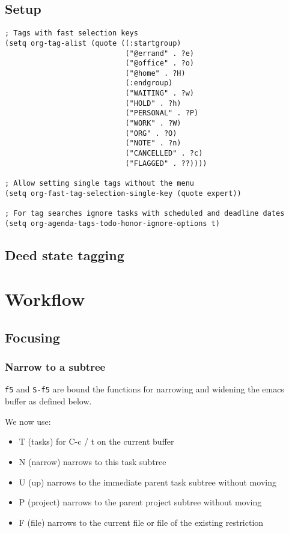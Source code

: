 \documentclass[11pt]{scrartcl}
\begin{document}
\subsection{Setup}
\label{sec:orgheadline51}
\begin{verbatim}
; Tags with fast selection keys
(setq org-tag-alist (quote ((:startgroup)
                            ("@errand" . ?e)
                            ("@office" . ?o)
                            ("@home" . ?H)
                            (:endgroup)
                            ("WAITING" . ?w)
                            ("HOLD" . ?h)
                            ("PERSONAL" . ?P)
                            ("WORK" . ?W)
                            ("ORG" . ?O)
                            ("NOTE" . ?n)
                            ("CANCELLED" . ?c)
                            ("FLAGGED" . ??))))

; Allow setting single tags without the menu
(setq org-fast-tag-selection-single-key (quote expert))

; For tag searches ignore tasks with scheduled and deadline dates
(setq org-agenda-tags-todo-honor-ignore-options t)
\end{verbatim}
\subsection{Deed state tagging}
\label{sec:orgheadline52}
\section{Workflow}
\label{sec:orgheadline57}
\subsection{Focusing}
\label{sec:orgheadline56}
\subsubsection{Narrow to a subtree}
\label{sec:orgheadline54}
    \texttt{f5} and \texttt{S-f5} are bound the functions for narrowing and widening the
emacs buffer as defined below.

We now use:

\begin{itemize}
\item T (tasks) for C-c / t on the current buffer
\item N (narrow) narrows to this task subtree
\item U (up) narrows to the immediate parent task subtree without moving
\item P (project) narrows to the parent project subtree without moving
\item F (file) narrows to the current file or file of the existing restriction
\end{itemize}
\end{document}
